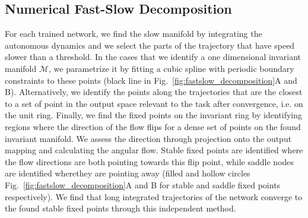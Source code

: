 \documentclass{article} %
\newcounter{ct}
\newcommand{\manifold}{\mathcal{M}}
\theoremstyle{definition}
\theoremstyle{remark}
\begin{document}




\subsection{Numerical Fast-Slow Decomposition}\label{sec:fastslowmethod}
For each trained network, we find the slow manifold  by integrating the autonomous dynamics and we select the parts of the trajectory that have speed slower than a threshold.
%
In the cases that we identify a one dimensional invariant manifold $\manifold$, we parametrize it by fitting a cubic spline with periodic boundary constraints to these points (black line in Fig.~\ref{fig:fastslow_decomposition}A and B).
Alternatively, we identify the points along the trajectories that are the closest to a set of point in the output space relevant to the task after convergence, i.e. on the unit ring.
Finally, we find the fixed points on the invariant ring by identifying regions where the direction of the flow flips for a dense set of points on the found invariant manifold.
We assess the direction through projection onto the output mapping and calculating the angular flow.
Stable fixed points are identified where the flow directions are both pointing towards this flip point, 
while saddle nodes are identified wherethey are pointing away (filled and hollow circles Fig.~\ref{fig:fastslow_decomposition}A and B for stable and saddle fixed points respectively).
We find that long integrated trajectories of the network converge to the found stable fixed points through this independent method.
\end{document}
